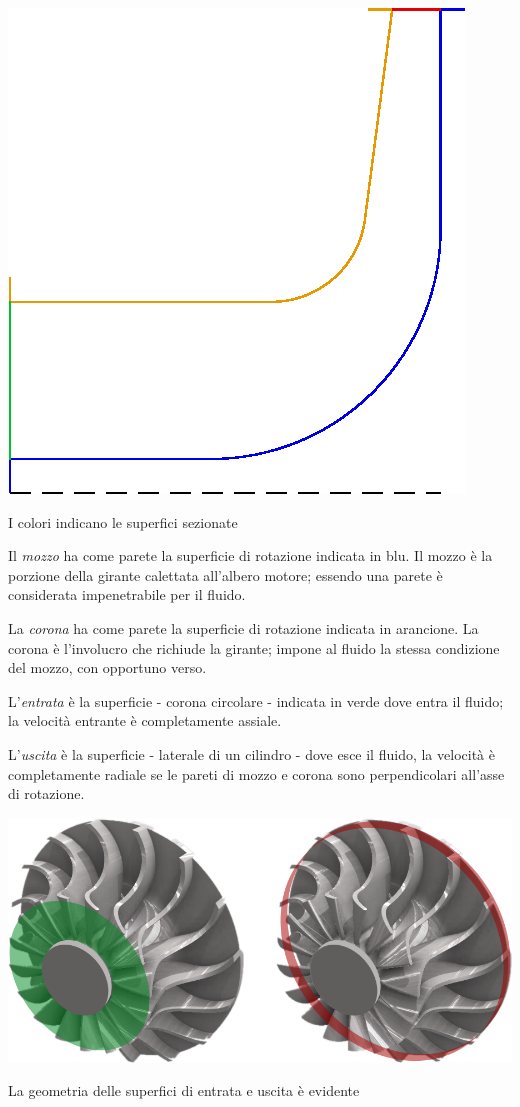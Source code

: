 \documentclass{tufte-handout}
\begin{document}
\begin{marginfigure}%
\centering
  \includegraphics[width=.6\linewidth]{colori.eps}
  \caption{I colori indicano le superfici sezionate}
  \label{fig:colori2d}
\end{marginfigure}

Il \emph{mozzo} ha come parete la superficie di rotazione indicata in blu. Il mozzo è la porzione della girante calettata all'albero motore;
essendo una parete è considerata impenetrabile per il fluido.

La \emph{corona} ha come parete la superficie di rotazione indicata in arancione.
La corona è l'involucro che richiude la girante; impone al fluido la stessa condizione
del mozzo, con opportuno verso.

L'\emph{entrata} è la superficie - corona circolare - indicata in verde
dove entra il fluido; la velocità entrante è completamente assiale.

L'\emph{uscita} è la superficie - laterale di un cilindro - dove esce il fluido, la velocità
è completamente radiale se le pareti di mozzo e
corona sono perpendicolari all'asse di rotazione.

\begin{marginfigure}%
  \includegraphics[width=\linewidth]{entratauscita3d.png}
  \caption{La geometria delle superfici di entrata e uscita è evidente}
  \label{fig:entusc3d}
\end{marginfigure}
\end{document}
